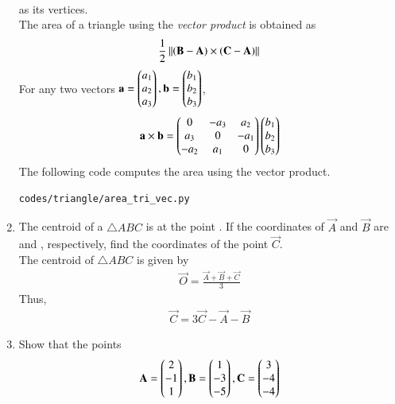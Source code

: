 \begin{enumerate}[label=\arabic*.,ref=\thesubsection.\theenumi]
\begin{align}
\end{align}
%
as its vertices.
\\
\solution The area of a triangle using the {\em vector product} is obtained as
\begin{align}
\frac{1}{2}\left\lVert\left(\mathbf{B}-\mathbf{A}\right)\times \left(\mathbf{C}-\mathbf{A}\right)\right\rVert
\end{align}
%
For any two vectors $\mathbf{a}=\begin{pmatrix}a_1\\a_2\\a_3\end{pmatrix}, \mathbf{b}=\begin{pmatrix}b_1\\b_2\\b_3\end{pmatrix}$, 
\begin{align}
\label{eq:tri_cross_prod}
\mathbf{a}\times \mathbf{b} = \begin{pmatrix}0 & -a_3 & a_2 \\ a_3 & 0 & -a_1 \\ -a_2 & a_1 & 0\end{pmatrix}\begin{pmatrix}b_1\\b_2\\b_3\end{pmatrix}
\end{align}
%
The following code computes the area using the vector product.
%
\begin{lstlisting}
codes/triangle/area_tri_vec.py
\end{lstlisting}
%
%
\item The centroid of a $\triangle ABC$ is at the point .  If the coordinates of $\vec{A}$ and $\vec{B}$ are  and , respectively, find the coordinates of the point $\vec{C}$.
%
\\
\solution The centroid of $\triangle ABC$ is given by
\begin{align}
\label{eq:tri_geo_ex_centroid}
\vec{O} = \frac{\vec{A}+\vec{B}+\vec{C}}{3}
\end{align}
%
Thus, 
\begin{align}
\vec{C} = 3\vec{C}-\vec{A}-\vec{B}
\end{align}
%
\item Show that the points 
\begin{align}
\vec{A} = \myvec{2\\-1 \\1},
\vec{B} = \myvec{1\\-3 \\-5},
\vec{C} = \myvec{3\\ -4\\-4}

\end{align}
\end{enumerate}
